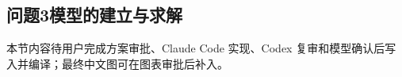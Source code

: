 \subsection{问题3模型的建立与求解}\label{sub:5.3}

本节内容待用户完成方案审批、Claude Code 实现、Codex 复审和模型确认后写入并编译；最终中文图可在图表审批后补入。
